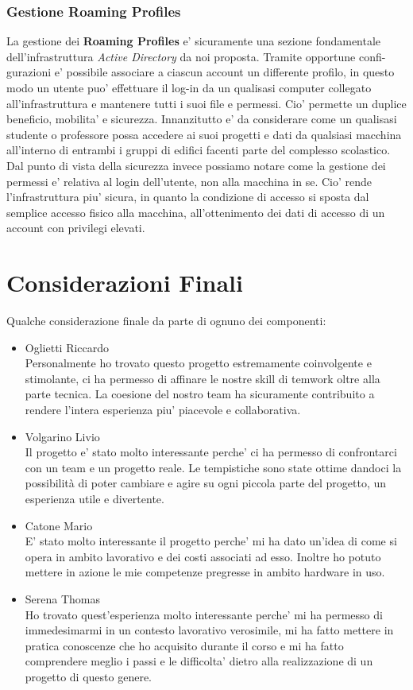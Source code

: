 \documentclass{report}
\begin{document}
			\subsection{Gestione Roaming Profiles}
				La gestione dei \textbf{Roaming Profiles} e' sicuramente una sezione fondamentale dell'infrastruttura
				\emph{Active Directory} da noi proposta. Tramite opportune confi-\\gurazioni e' possibile associare 
				a ciascun account un differente profilo, in questo modo un utente puo' effettuare il log-in da un
				qualisasi computer collegato all'infrastruttura e mantenere tutti i suoi file e permessi.
				Cio' permette un duplice beneficio, mobilita' e sicurezza. Innanzitutto e' da considerare come 
				un qualisasi studente o professore possa accedere ai suoi progetti e dati da qualsiasi macchina 
				all'interno di entrambi i gruppi di edifici facenti parte del complesso scolastico. Dal punto 
				di vista della sicurezza invece possiamo notare come la gestione dei permessi e' relativa al
				login dell'utente, non alla macchina in se. Cio' rende l'infrastruttura piu' sicura, in quanto
				la condizione di accesso si sposta dal semplice accesso fisico alla macchina, all'ottenimento dei
				dati di accesso di un account con privilegi elevati.
	\chapter{Considerazioni Finali}
		Qualche considerazione finale da parte di ognuno dei componenti:
		\begin{itemize}
			\item Oglietti Riccardo\\
				Personalmente ho trovato questo progetto estremamente coinvolgente e stimolante, ci ha permesso di
				 affinare le nostre skill di temwork oltre alla parte tecnica. La coesione del nostro team ha
				 sicuramente contribuito a rendere l'intera esperienza piu' piacevole e collaborativa.
			\item Volgarino Livio\\
				Il progetto e' stato molto interessante perche' ci ha permesso di confrontarci con un team e un progetto
				 reale. Le tempistiche sono state ottime dandoci la possibilità di poter cambiare e agire su ogni piccola
				 parte del progetto, un esperienza utile e divertente. 
			\item Catone Mario\\
				E' stato molto interessante il progetto perche' mi ha dato un'idea di come si opera in ambito lavorativo
				 e dei costi associati ad esso. Inoltre ho potuto mettere in azione le mie competenze pregresse in
				 ambito hardware in uso.
			\item Serena Thomas\\
				Ho trovato quest'esperienza molto interessante perche' mi ha permesso di immedesimarmi in un contesto
				 lavorativo verosimile, mi ha fatto mettere in pratica conoscenze che ho acquisito durante il corso e
				 mi ha fatto comprendere meglio i passi e le difficolta' dietro alla realizzazione di un progetto di
				 questo genere.
		\end{itemize}
\end{document}
